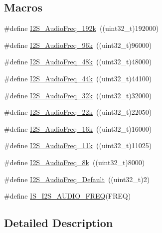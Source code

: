 \subsection*{Macros}
\begin{DoxyCompactItemize}
\item 
\#define \hyperlink{group___i2_s___audio___frequency_gadfdaed9a2acb71f2cdd737be81a6f747}{I2\+S\+\_\+\+Audio\+Freq\+\_\+192k}~((uint32\+\_\+t)192000)
\item 
\#define \hyperlink{group___i2_s___audio___frequency_ga5acd02a974e90bb8f2c4e07f8fa0231b}{I2\+S\+\_\+\+Audio\+Freq\+\_\+96k}~((uint32\+\_\+t)96000)
\item 
\#define \hyperlink{group___i2_s___audio___frequency_gac5f3f0416f9dd03d680d0fcee93b50ab}{I2\+S\+\_\+\+Audio\+Freq\+\_\+48k}~((uint32\+\_\+t)48000)
\item 
\#define \hyperlink{group___i2_s___audio___frequency_ga3514e4c292b92b8a7d8a6916f4e3690c}{I2\+S\+\_\+\+Audio\+Freq\+\_\+44k}~((uint32\+\_\+t)44100)
\item 
\#define \hyperlink{group___i2_s___audio___frequency_gac501b566718f4890aaafa323a33b732c}{I2\+S\+\_\+\+Audio\+Freq\+\_\+32k}~((uint32\+\_\+t)32000)
\item 
\#define \hyperlink{group___i2_s___audio___frequency_gac6adafe5586e83c2408f1eab8edb4ab3}{I2\+S\+\_\+\+Audio\+Freq\+\_\+22k}~((uint32\+\_\+t)22050)
\item 
\#define \hyperlink{group___i2_s___audio___frequency_ga5b8f2f8393e022becf0dbb04d1b01950}{I2\+S\+\_\+\+Audio\+Freq\+\_\+16k}~((uint32\+\_\+t)16000)
\item 
\#define \hyperlink{group___i2_s___audio___frequency_ga3adf95fadd1ad75670ed1babd5faca39}{I2\+S\+\_\+\+Audio\+Freq\+\_\+11k}~((uint32\+\_\+t)11025)
\item 
\#define \hyperlink{group___i2_s___audio___frequency_ga7868ac234485a80d45586dd87cd00043}{I2\+S\+\_\+\+Audio\+Freq\+\_\+8k}~((uint32\+\_\+t)8000)
\item 
\#define \hyperlink{group___i2_s___audio___frequency_ga30f78e8214e8a91cdb6d6360c1d3f18d}{I2\+S\+\_\+\+Audio\+Freq\+\_\+\+Default}~((uint32\+\_\+t)2)
\item 
\#define \hyperlink{group___i2_s___audio___frequency_gaf39d917f4a38fd9916ec347fb055391c}{I\+S\+\_\+\+I2\+S\+\_\+\+A\+U\+D\+I\+O\+\_\+\+F\+R\+EQ}(F\+R\+EQ)
\end{DoxyCompactItemize}


\subsection{Detailed Description}


